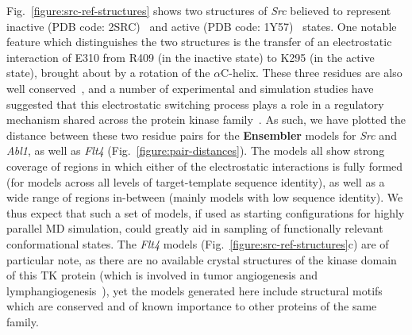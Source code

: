 \documentclass[aps,pre,twocolumn,nofootinbib,superscriptaddress,linenumbers]{revtex4-1}
\begin{document}
Fig.~\ref{figure:src-ref-structures} shows two structures of \emph{Src} believed to represent inactive (PDB code: 2SRC)~\cite{xu:1999:2src} and active (PDB code: 1Y57)~\cite{cowan-jacob:2005:1y57} states.
One notable feature which distinguishes the two structures is the transfer of an electrostatic interaction of E310 from R409 (in the inactive state) to K295 (in the active state), brought about by a rotation of the $\alpha$C-helix.
These three residues are also well conserved~\cite{kannan:jmb:2005:kinase-regulation}, and a number of experimental and simulation studies have suggested that this electrostatic switching process plays a role in a regulatory mechanism shared across the protein kinase family~\cite{shukla-pande:nature-commun:2014:src-activation-msm, foda:nat-comm:2015:src, ozkirimli:prot-sci:2008:src}.
As such, we have plotted the distance between these two residue pairs for the {\bf Ensembler} models for \emph{Src} and \emph{Abl1}, as well as \emph{Flt4} (Fig.~\ref{figure:pair-distances}).
The models all show strong coverage of regions in which either of the electrostatic interactions is fully formed (for models across all levels of target-template sequence identity), as well as a wide range of regions in-between (mainly models with low sequence identity).
We thus expect that such a set of models, if used as starting configurations for highly parallel MD simulation, could greatly aid in sampling of functionally relevant conformational states.
\color{red}
The \emph{Flt4} models (Fig.~\ref{figure:src-ref-structures}c) are of particular note, as there are no available crystal structures of the kinase domain of this TK protein (which is involved in tumor angiogenesis and lymphangiogenesis~\cite{Su:2006:flt4cancer}), yet the models generated here include structural motifs which are conserved and of known importance to other proteins of the same family.
\color{black}

\end{document}
